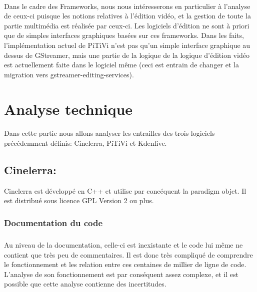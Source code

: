 \paragraph {}

Dans le cadre des Frameworks, nous nous intéresserons en particulier
à l'analyse de ceux-ci puisque les notions relatives à l'édition
vidéo, et la gestion de toute la partie multimédia est réalisée
par ceux-ci. Les logiciels d'édition ne sont à priori que de simples
interfaces graphiques basées sur ces frameworks. Dans les faits,
l'implémentation actuel de PiTiVi n'est pas qu'un simple interface
graphique au dessus de GStreamer, mais une partie de la logique de la
logique d'édition vidéo est actuellement faite dans le logiciel même
(ceci est entrain de changer et la migration \cite{PitviPortToGes}
vers gstreamer-editing-services\cite{PresentationOfGes}).

\newpage \section{Analyse technique}

\paragraph {}

Dans cette partie nous allons analyser les entrailles des trois logiciels
précédemment définis: Cinelerra, PiTiVi et Kdenlive.

\subsection{Cinelerra:}

Cinelerra est développé en C++ et utilise par concéquent la paradigm
objet.  Il est distribué sous licence GPL Version 2 ou plus.

\subsubsection{Documentation du code}

\subparagraph{}

Au niveau de la documentation, celle-ci est inexistante et le code
lui même ne contient que très peu de commentaires. Il est donc très
compliqué de comprendre le fonctionnement et les relation entre ces
centaines de millier de ligne de code. L'analyse de son fonctionnement
est par conséquent assez complexe, et il est possible que cette analyse
contienne des incertitudes.

